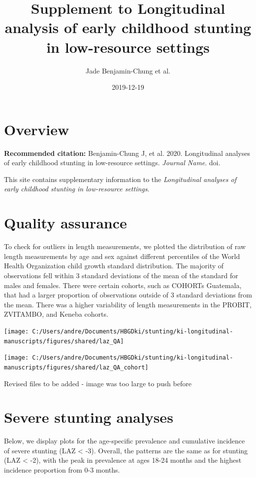 \documentclass[9pt,]{book}
\title{Supplement to Longitudinal analysis of early childhood stunting in
low-resource settings}
\author{Jade Benjamin-Chung et al.}
\date{2019-12-19}
\begin{document}
\maketitle

{
\setcounter{tocdepth}{1}
\tableofcontents
}
\chapter{Overview}\label{overview}

\textbf{Recommended citation:} Benjamin-Chung J, et al. 2020.
Longitudinal analyses of early childhood stunting in low-resource
settings. \emph{Journal Name}. doi.

This site contains supplementary information to the \emph{Longitudinal
analyses of early childhood stunting in low-resource settings}.

\chapter{Quality assurance}\label{QA}

\raggedright

To check for outliers in length measurements, we plotted the
distribution of raw length measurements by age and sex against different
percentiles of the World Health Organization child growth standard
distribution. The majority of observations fell within 3 standard
deviations of the mean of the standard for males and females. There were
certain cohorts, such as COHORTs Guatemala, that had a larger proportion
of observations outside of 3 standard deviations from the mean. There
was a higher variability of length measurements in the PROBIT, ZVITAMBO,
and Keneba cohorts.

\texttt{[image: C:/Users/andre/Documents/HBGDki/stunting/ki-longitudinal-manuscripts/figures/shared/laz\_QA]}

\texttt{[image: C:/Users/andre/Documents/HBGDki/stunting/ki-longitudinal-manuscripts/figures/shared/laz\_QA\_cohort]}

Revised files to be added - image was too large to push before

\chapter{Severe stunting analyses}\label{severe-stunting}

\raggedright

Below, we display plots for the age-specific prevalence and cumulative
incidence of severe stunting (LAZ \textless{} -3). Overall, the patterns
are the same as for stunting (LAZ \textless{} -2), with the peak in
prevalence at ages 18-24 months and the highest incidence proportion
from 0-3 months.
\end{document}
